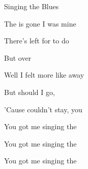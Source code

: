 \begin{SBSong}{Singing the Blues}
\begin{SBVerse}
	The  is gone I  was mine
	
	There's  left for  to do
	
	But  over 
  \end{SBVerse}
  \begin{SBVerse}
	Well I  felt more like  away
	
	But  should I go,
	
	'Cause  couldn't stay,  you
	
	You got me singing the    
	
	You got me singing the    
	
	You got me singing the     
  \end{SBVerse}
\end{SBSong}
